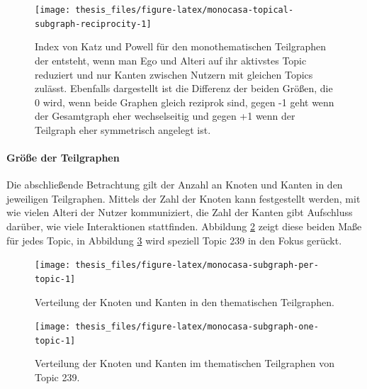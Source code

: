 \documentclass[11pt,a4paper,twoside]{article}
\let\oldpar\paragraph
\renewcommand{\paragraph}{\oldpar*}
\begin{document}
\begin{figure}

{\centering \texttt{[image: thesis\_files/figure-latex/monocasa-topical-subgraph-reciprocity-1]} 

}

\caption{Index von Katz und Powell
für den monothematischen Teilgraphen der entsteht, wenn man Ego und
Alteri auf ihr aktivstes Topic reduziert und nur Kanten zwischen Nutzern
mit gleichen Topics zulässt. Ebenfalls dargestellt ist die Differenz der
beiden Größen, die 0 wird, wenn beide Graphen gleich reziprok sind,
gegen -1 geht wenn der Gesamtgraph eher wechselseitig und gegen +1 wenn
der Teilgraph eher symmetrisch angelegt ist.}\label{fig:monocasa-topical-subgraph-reciprocity}
\end{figure}

\hypertarget{groe-der-teilgraphen}{%
\paragraph{Größe der Teilgraphen}\label{groe-der-teilgraphen}}

Die abschließende Betrachtung gilt der Anzahl an Knoten und Kanten in
den jeweiligen Teilgraphen. Mittels der Zahl der Knoten kann
festgestellt werden, mit wie vielen Alteri der Nutzer kommuniziert, die
Zahl der Kanten gibt Aufschluss darüber, wie viele Interaktionen
stattfinden. Abbildung \ref{fig:monocasa-subgraph-per-topic} zeigt diese
beiden Maße für jedes Topic, in Abbildung
\ref{fig:monocasa-subgraph-one-topic} wird speziell Topic 239 in den
Fokus gerückt.




\begin{figure}

{\centering \texttt{[image: thesis\_files/figure-latex/monocasa-subgraph-per-topic-1]} 

}

\caption{Verteilung der Knoten und Kanten in
den thematischen Teilgraphen.}\label{fig:monocasa-subgraph-per-topic}
\end{figure}




\begin{figure}

{\centering \texttt{[image: thesis\_files/figure-latex/monocasa-subgraph-one-topic-1]} 

}

\caption{Verteilung der Knoten und Kanten im
thematischen Teilgraphen von Topic 239.}\label{fig:monocasa-subgraph-one-topic}
\end{figure}
\end{document}
